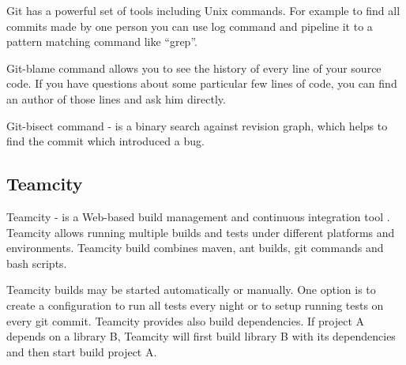   Git has a powerful set of tools including  Unix commands. For example to find
  all commits made by one person you can use log command and pipeline it to a pattern
  matching command like ``grep''.
  
   Git-blame command allows you to see the history of every line of your source
   code. If you have questions about some particular few lines of code,
   you can find an author of those lines and ask him directly.
   
   Git-bisect command - is a binary search against revision graph, which helps to find the commit which
   introduced a bug.

  \subsection{Teamcity}
  Teamcity - is a Web-based build management and continuous integration tool
  \cite{teamcity}.
  Teamcity allows running multiple builds and tests under different platforms and environments.
  Teamcity build combines maven, ant builds, git commands and bash scripts.
  
  Teamcity builds may be started automatically or manually. One option is to create a configuration 
  to run all  tests every night or to setup running tests on every git commit. Teamcity
  provides also build dependencies. If project A depends on a library B,
  Teamcity will first build library B with its dependencies and then start build
  project A.
  
